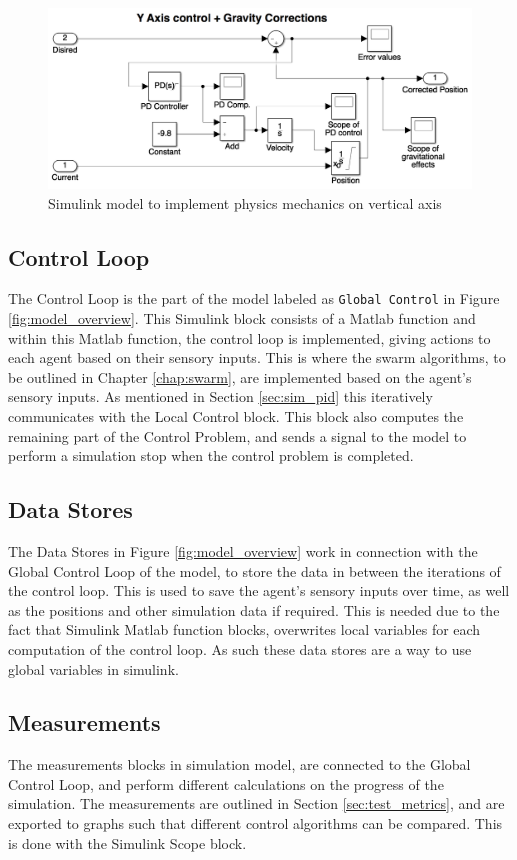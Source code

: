 \begin{figure}
	\centering
	\includegraphics[width=.8\columnwidth]{figures/simulink_gravity_y}
  	\caption{\label{fig:gravity_blocks}Simulink model to implement physics mechanics on vertical axis}
\end{figure}

\subsection{Control Loop}
\label{sim:sec:control_loop}
The Control Loop is the part of the model labeled as \texttt{Global Control} in Figure \ref{fig:model_overview}. This Simulink block consists of a Matlab function and within this Matlab function, the control loop is implemented, giving actions to each agent based on their sensory inputs. This is where the swarm algorithms, to be outlined in Chapter \ref{chap:swarm}, are implemented based on the agent's sensory inputs. As mentioned in Section \ref{sec:sim_pid} this iteratively communicates with the Local Control block. This block also computes the remaining part of the Control Problem, and sends a signal to the model to perform a simulation stop when the control problem is completed. 
 
\subsection{Data Stores}
The Data Stores in Figure \ref{fig:model_overview} work in connection with the Global Control Loop of the model, to store the data in between the iterations of the control loop. This is used to save the agent's sensory inputs over time, as well as the positions and other simulation data if required. This is needed due to the fact that Simulink Matlab function blocks, overwrites local variables for each computation of the control loop. As such these data stores are a way to use global variables in simulink. 

\subsection{Measurements}
The measurements blocks in simulation model, are connected to the Global Control Loop, and perform different calculations on the progress of the simulation. The measurements are outlined in Section \ref{sec:test_metrics}, and are exported to graphs such that different control algorithms can be compared. This is done with the Simulink Scope block. 

